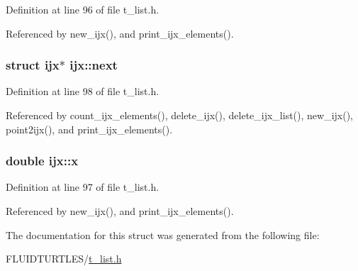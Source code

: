 Definition at line 96 of file t\-\_\-list.\-h.



Referenced by new\-\_\-ijx(), and print\-\_\-ijx\-\_\-elements().

\hypertarget{structijx_a0730f1502a3d1cc7336b9e6db1360aef}{
\subsubsection[{next}]{\setlength{\rightskip}{0pt plus 5cm}struct {\bf ijx}$\ast$ ijx\-::next}}\label{structijx_a0730f1502a3d1cc7336b9e6db1360aef}


Definition at line 98 of file t\-\_\-list.\-h.



Referenced by count\-\_\-ijx\-\_\-elements(), delete\-\_\-ijx(), delete\-\_\-ijx\-\_\-list(), new\-\_\-ijx(), point2ijx(), and print\-\_\-ijx\-\_\-elements().

\hypertarget{structijx_a2755acb599af9a8ece442b3f8e572500}{
\subsubsection[{x}]{\setlength{\rightskip}{0pt plus 5cm}double ijx\-::x}}\label{structijx_a2755acb599af9a8ece442b3f8e572500}


Definition at line 97 of file t\-\_\-list.\-h.



Referenced by new\-\_\-ijx(), and print\-\_\-ijx\-\_\-elements().



The documentation for this struct was generated from the following file\-:\begin{DoxyCompactItemize}
\item 
F\-L\-U\-I\-D\-T\-U\-R\-T\-L\-E\-S/\hyperlink{t__list_8h}{t\-\_\-list.\-h}\end{DoxyCompactItemize}
